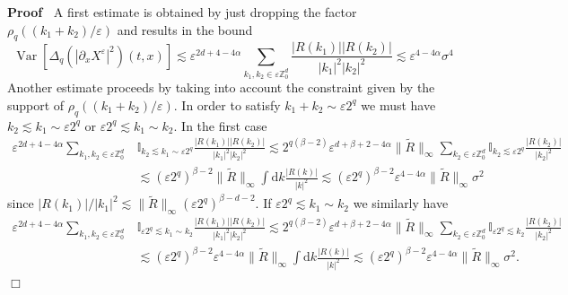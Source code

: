 \documentclass[a4paper,11pt]{article}
\newcommand{\mathd}{\mathrm{d}}
\newcommand{\tmop}[1]{\ensuremath{\operatorname{#1}}}
\newenvironment{proof}{\noindent\textbf{Proof\ }}{\hspace*{\fill}$\Box$\medskip}
\begin{document}
\begin{proof}
A first estimate is obtained by just dropping the factor $ \rho_q ((k_1 + k_2) / \varepsilon)$ and results in the bound
\[
\tmop{Var} [\Delta_q (| \partial_x X^{\varepsilon} |^2) (t, x)] \lesssim
     \varepsilon^{2 d + 4 - 4 \alpha} \sum_{k_1, k_2 \in \varepsilon
     \mathbb{Z}^d_0} \frac{| R (k_1) |
     | R (k_2) |}{| k_1 |^2  | k_2 |^2} \lesssim    \varepsilon^{ 4 - 4 \alpha} \sigma^4
\]
Another estimate proceeds by taking into account the constraint given by the support of  $ \rho_q ((k_1 + k_2) / \varepsilon)$. In
 order to satisfy $k_1 + k_2 \sim \varepsilon 2^q$ we must have $k_2
  \lesssim k_1 \sim \varepsilon 2^q$ or $\varepsilon 2^q \lesssim k_1 \sim
  k_2$. In the first case
  \begin{align*}
     \varepsilon^{2 d + 4 - 4 \alpha} \sum_{k_1, k_2 \in \varepsilon \mathbb{Z}^d_0} & \mathbb{I}_{k_2 \lesssim k_1 \sim \varepsilon 2^q} \frac{| R (k_1) |  | R (k_2) |}{| k_1 |^2  | k_2 |^2}  \lesssim 2^{q(\beta-2)} \varepsilon^{ d  + \beta+ 2 - 4 \alpha} \| \tilde R \|_{\infty} \sum_{k_2 \in \varepsilon \mathbb{Z}^d_0} \mathbb{I}_{k_2 \lesssim \varepsilon 2^q} \frac{| R (k_2) |}{| k_2 |^2} \\
     & \lesssim (\varepsilon 2^q)^{\beta - 2} \| \tilde R \|_{\infty} \int \mathd k  \frac{| R (k) |}{| k |^2} \lesssim  (\varepsilon 2^q)^{\beta - 2} \varepsilon^{4 - 4 \alpha} \| \tilde R \|_{\infty} \sigma^2
  \end{align*}
  since $| R (k_1) | / | k_1 |^2 \lesssim \| \tilde R \|_{\infty} (\varepsilon 2^q)^{\beta-d-2}$. If $\varepsilon 2^q \lesssim k_1 \sim k_2$ we similarly have
  \begin{align*}
     \varepsilon^{2 d + 4 - 4 \alpha} \sum_{k_1, k_2 \in \varepsilon \mathbb{Z}^d_0} & \mathbb{I}_{\varepsilon 2^q \lesssim k_1 \sim k_2} \frac{| R (k_1) |  | R (k_2) |}{| k_1 |^2  | k_2 |^2} \lesssim 2^{q(\beta-2)} \varepsilon^{d +\beta + 2 - 4 \alpha} \|\tilde R \|_{\infty} \sum_{k_2 \in \varepsilon \mathbb{Z}^d_0} \mathbb{I}_{\varepsilon 2^q \lesssim k_2} \frac{ | R (k_2) |}{ | k_2 |^2} \\
     & \lesssim  (\varepsilon 2^q)^{\beta - 2} \varepsilon^{4 - 4 \alpha} \| \tilde R \|_{\infty} \int \mathd k \frac{| R (k) |}{| k |^2}
       \lesssim  (\varepsilon 2^q)^{\beta - 2} \varepsilon^{4 - 4 \alpha} \| \tilde R \|_{\infty} \sigma^2.
  \end{align*}
\end{proof}
\end{document}
